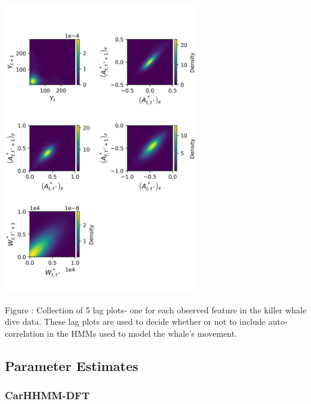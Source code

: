 \documentclass{article}
\begin{document}
        \begin{center}
        \includegraphics[height=5in]{../Plots/CarHHMM2_lagplot.png}
        \end{center}
        
        \noindent Figure : Collection of 5 lag plots- one for each observed feature in the killer whale dive data. These lag plots are used to decide whether or not to include auto-correlation in the HMMs used to model the whale's movement.
        \addtocounter{fignum}{1}
        
        \newpage
    
    \subsection{Parameter Estimates}

        \subsubsection{CarHHMM-DFT}
        
\end{document}
